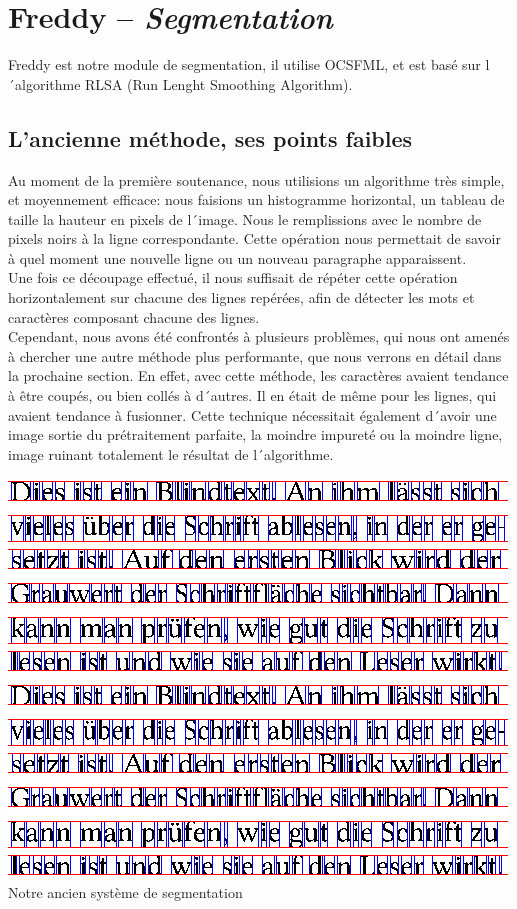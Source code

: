 \chapter{Freddy -- \emph{Segmentation}}

Freddy est notre module de segmentation, il utilise OCSFML, et est basé sur l´algorithme RLSA (Run Lenght Smoothing Algorithm).

\section{L'ancienne méthode, ses points faibles}

Au moment de la première soutenance, nous utilisions un algorithme très simple, et moyennement efficace: nous faisions un histogramme horizontal, un tableau de taille la hauteur en pixels de l´image. Nous le remplissions avec le nombre de pixels noirs à la ligne correspondante. Cette opération nous permettait de savoir à quel moment une nouvelle ligne ou un nouveau paragraphe apparaissent.\\
Une fois ce découpage effectué, il nous suffisait de répéter cette opération horizontalement sur chacune des lignes repérées, afin de détecter les mots et caractères composant chacune des lignes.\\
Cependant, nous avons été confrontés à plusieurs problèmes, qui nous ont amenés à chercher une autre méthode plus performante, que nous verrons en détail dans la prochaine section. En effet, avec cette méthode, les caractères avaient tendance à être coupés, ou bien collés à d´autres. Il en était de même pour les lignes, qui avaient tendance à fusionner. Cette technique nécessitait également d´avoir une image sortie du prétraitement parfaite, la moindre impureté ou la moindre ligne, image ruinant totalement le résultat de l´algorithme.

\begin{center}
  \includegraphics[scale=1]{Pictures/segmented.png}
  Notre ancien système de segmentation
\end{center}


